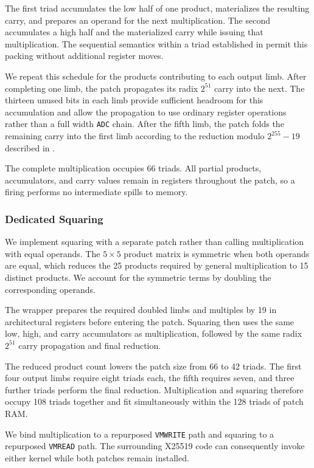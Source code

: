 \documentclass[journal=tches,submission]{iacrtrans}
\newcommand{\code}[1]{\texttt{#1}}
\begin{document}
The first triad accumulates the low half of one product, materializes the resulting carry, and prepares an operand for the next multiplication.
The second accumulates a high half and the materialized carry while issuing that multiplication.
The sequential semantics within a triad established in  permit this packing without additional register moves.

We repeat this schedule for the products contributing to each output limb.
After completing one limb, the patch propagates its radix $2^{51}$ carry into the next.
The thirteen unused bits in each limb provide sufficient headroom for this accumulation and allow the propagation to use ordinary register operations rather than a full width \code{ADC} chain.
After the fifth limb, the patch folds the remaining carry into the first limb according to the reduction modulo $2^{255}-19$ described in .

The complete multiplication occupies 66 triads.
All partial products, accumulators, and carry values remain in registers throughout the patch, so a firing performs no intermediate spills to memory.

\subsubsection{Dedicated Squaring}
\label{sec:c25519-square}

We implement squaring with a separate patch rather than calling multiplication with equal operands.
The $5\times5$ product matrix is symmetric when both operands are equal, which reduces the 25 products required by general multiplication to 15 distinct products.
We account for the symmetric terms by doubling the corresponding operands.

The wrapper prepares the required doubled limbs and multiples by 19 in architectural registers before entering the patch.
Squaring then uses the same low, high, and carry accumulators as multiplication, followed by the same radix $2^{51}$ carry propagation and final reduction.

The reduced product count lowers the patch size from 66 to 42 triads.
The first four output limbs require eight triads each, the fifth requires seven, and three further triads perform the final reduction.
Multiplication and squaring therefore occupy 108 triads together and fit simultaneously within the 128 triads of patch RAM.

We bind multiplication to a repurposed \code{VMWRITE} path and squaring to a repurposed \code{VMREAD} path.
The surrounding X25519 code can consequently invoke either kernel while both patches remain installed.
\end{document}
